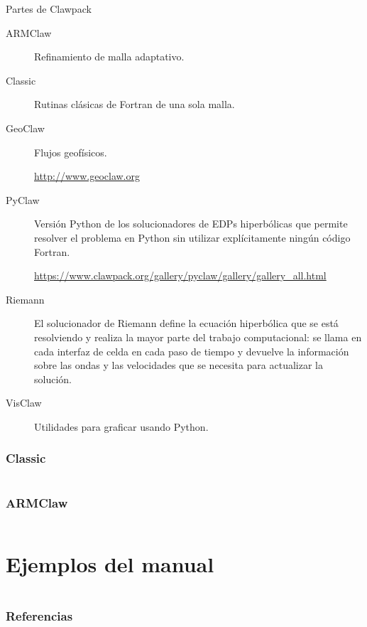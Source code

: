 \begin{frame}
  \begin{block}{Partes de Clawpack}
    \begin{description}
      \item[ARMClaw]

        Refinamiento de malla adaptativo.

      \item[Classic]

        Rutinas clásicas de Fortran de una sola malla.

      \item[GeoClaw]

        Flujos geofísicos.

        \url{http://www.geoclaw.org}

      \item[PyClaw]

        Versión Python de los solucionadores de EDPs hiperbólicas
        que permite resolver el problema en Python sin utilizar
        explícitamente ningún código Fortran.

        \url{https://www.clawpack.org/gallery/pyclaw/gallery/gallery_all.html}

      \item[Riemann]

        El solucionador de Riemann define la ecuación hiperbólica
        que se está resolviendo y realiza la mayor parte del trabajo
        computacional: se llama en cada interfaz de celda en cada
        paso de tiempo y devuelve la información sobre las ondas
        y las velocidades que se necesita para actualizar la
        solución.

      \item[VisClaw]

        Utilidades para graficar usando Python.
    \end{description}
  \end{block}
\end{frame}

\begin{frame}[fragile]
  \frametitle{Classic}
  \inputminted[fontsize=\tiny,firstline=5,lastline=27]{bash}{script.sh}
\end{frame}

\begin{frame}[fragile]
  \frametitle{ARMClaw}
  \inputminted[fontsize=\tiny,firstline=29,lastline=51]{bash}{script.sh}
\end{frame}

\section{Ejemplos del manual~\cite{Ancey2025}}

\begin{frame}
  \inputminted[fontsize=\tiny,firstline=1,lastline=27]{python}{chapter1.py}
\end{frame}

\begin{frame}
  \frametitle{Referencias}

  \nocite{*}
  \printbibliography[heading=none]
\end{frame}

